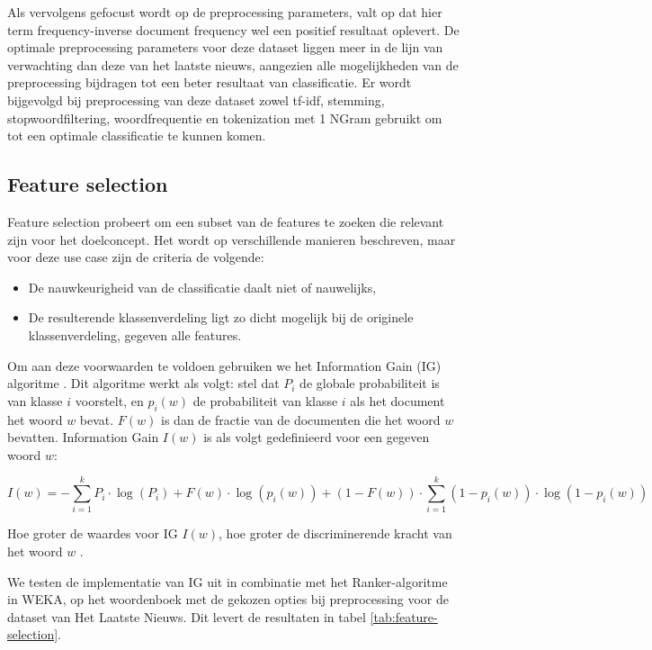 Als vervolgens gefocust wordt op de preprocessing parameters, valt op dat hier term frequency-inverse document frequency wel een positief resultaat oplevert. De optimale preprocessing parameters voor deze dataset liggen meer in de lijn van verwachting dan deze van het laatste nieuws, aangezien alle mogelijkheden van de preprocessing bijdragen tot een beter resultaat van classificatie. Er wordt bijgevolgd bij preprocessing van deze dataset zowel tf-idf, stemming, stopwoordfiltering, woordfrequentie en tokenization met 1 NGram gebruikt om tot een optimale classificatie te kunnen komen.

\subsection{Feature selection}\label{IG}
Feature selection probeert om een subset van de features te zoeken die relevant zijn voor het doelconcept. Het wordt op verschillende manieren beschreven, maar voor deze use case zijn de criteria de volgende:
\begin{itemize}
\item De nauwkeurigheid van de classificatie daalt niet of nauwelijks,
\item De resulterende klassenverdeling ligt zo dicht mogelijk bij de originele klassenverdeling, gegeven alle features.
\end{itemize}

Om aan deze voorwaarden te voldoen gebruiken we het Information Gain (IG) algoritme \cite{Liu2005}. Dit algoritme werkt als volgt: stel dat $P_i$ de globale probabiliteit is van klasse $i$ voorstelt, en $p_{i}(w)$ de probabiliteit van klasse $i$ als het document het woord $w$ bevat. $F(w)$ is dan de fractie van de documenten die het woord $w$ bevatten. Information Gain $I(w)$ is als volgt gedefinieerd voor een gegeven woord  $w$:

\begin{equation}
I(w) = -\sum_{i=1}^{k}P_i\cdot\log{(P_i)} + F(w)\cdot\log(p_i(w)) + (1 - F(w))\cdot\sum_{i=1}^{k}(1-p_i(w))\cdot\log(1-p_i(w))
\end{equation}

Hoe groter de waardes voor IG $I(w)$, hoe groter de discriminerende kracht van het woord $w$ \cite{Forman2003}.

We testen de implementatie van IG uit  in combinatie met het Ranker-algoritme in WEKA, op het woordenboek met de gekozen opties bij preprocessing voor de dataset van Het Laatste Nieuws. Dit levert de resultaten in tabel \ref{tab:feature-selection}.

